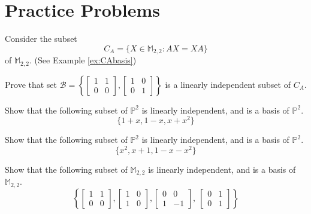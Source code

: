 \documentclass{ximera}
\begin{document}
\section*{Practice Problems}
\begin{problem}\label{prob:CABlinind}
Consider the subset
\begin{equation*}
C_A = \{X \in\mathbb{M}_{2,2} : AX = XA \}
\end{equation*}
of $\mathbb{M}_{2,2}$. (See Example \ref{ex:CAbasis}) 

Prove that set $\mathcal{B}=\left\{\begin{bmatrix}1&1\\0&0\end{bmatrix},\begin{bmatrix}1&0\\0&1\end{bmatrix}\right\}$ is a linearly independent subset of $C_A$.
\end{problem}

\begin{problem}\label{prob:linindabstractvsp1}
Show that the following subset of $\mathbb{P}^{2}$ is linearly independent, and is a basis of $\mathbb{P}^{2}$.
$$\{1 + x, 1 - x, x + x^{2}\}$$
\end{problem}

\begin{problem}\label{prob:linindabstractvsp2}
Show that the following subset of $\mathbb{P}^{2}$ is linearly independent, and is a basis of $\mathbb{P}^{2}$.
$$\{x^{2}, x + 1, 1 - x - x^{2}\}$$ 
\end{problem}

\begin{problem}\label{prob:linindabstractvsp3}
Show that the following subset of $\mathbb{M}_{2,2}$ is linearly independent, and is a basis of $\mathbb{M}_{2,2}$.
$$
\left\{
\begin{bmatrix}
1 & 1 \\
0 & 0
\end{bmatrix}
, 
\begin{bmatrix}
1 & 0 \\
1 & 0
\end{bmatrix}
, 
\begin{bmatrix}
0 & 0 \\
1 & -1
\end{bmatrix}
,\
\begin{bmatrix}
0 & 1 \\
0 & 1
\end{bmatrix}
\right\}$$ 
\end{problem}
\end{document}
